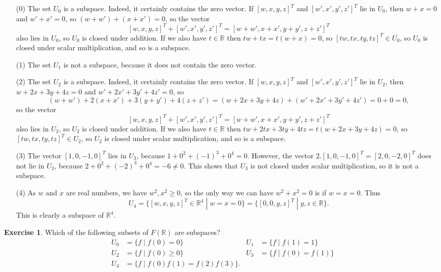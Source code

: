 \documentclass{amsart}
\newcommand{\R}         {{\mathbb{R}}}
\newcommand{\st}        {\;|\;}
\renewcommand{\:}       {\colon}
\theoremstyle{definition}
\newtheorem{exercise}{Exercise}[section]
\renewenvironment{solution}{\SolutionAtEnd}{\endSolutionAtEnd}
\begin{document}
\begin{solution}
 \begin{itemize}
  \item[(0)] The set $U_0$ is a subspace.  Indeed, it
   certainly contains the zero vector.  If $[w,x,y,z]^T$ and
   $[w',x',y',z']^T$ lie in $U_0$, then $w+x=0$ and $w'+x'=0$,
   so $(w+w')+(x+x')=0$, so the vector
   \[ [w,x,y,z]^T+[w',x',y',z']^T=[w+w',x+x',y+y',z+z']^T \]
   also lies in $U_0$, so $U_0$ is closed under addition.
   If we also have $t\in\R$ then $tw+tx=t(w+x)=0$, so
   $[tw,tx,ty,tz]^T\in U_0$, so $U_0$ is closed under scalar
   multiplication, and so is a subspace.
  \item[(1)] The set $U_1$ is not a subspace, because it
   does not contain the zero vector.
  \item[(2)] The set $U_2$ is a subspace.  Indeed, it
   certainly contains the zero vector.  If $[w,x,y,z]^T$ and
   $[w',x',y',z']^T$ lie in $U_2$, then $w+2x+3y+4z=0$ and
   $w'+2x'+3y'+4z'=0$, so 
   \[ (w+w')+2(x+x')+3(y+y')+4(z+z') = 
      (w+2x+3y+4z)+(w'+2x'+3y'+4z') = 0+0 = 0,
   \] 
   so the vector
   \[ [w,x,y,z]^T+[w',x',y',z']^T=[w+w',x+x',y+y',z+z']^T \]
   also lies in $U_2$, so $U_2$ is closed under addition.  If we
   also have $t\in\R$ then $tw+2tx+3ty+4tz=t(w+2x+3y+4z)=0$,
   so $[tw,tx,ty,tz]^T\in U_2$, so $U_2$ is closed under
   scalar multiplication, and so is a subspace.
  \item[(3)] The vector $[1,0,-1,0]^T$ lies in $U_3$, because
   $1+0^2+(-1)^3+0^4=0$.  However, the vector
   $2.[1,0,-1,0]^T=[2,0,-2,0]^T$ does not lie in $U_3$, because
   $2+0^2+(-2)^3+0^4=-6\neq 0$.  This shows that $U_3$ is
   not closed under scalar multiplication, so it is not a
   subspace.
  \item[(4)] As $w$ and $x$ are real numbers, we have
   $w^2,x^2\geq 0$, so the only way we can have $w^2+x^2=0$
   is if $w=x=0$.  Thus 
   \[ U_4 = \{[w,x,y,z]^T\in\R^4\st w=x=0\} = 
            \{[0,0,y,z]^T\st y,z\in\R\}. 
   \]
   This is clearly a subspace of $\R^4$.
 \end{itemize}
\end{solution}
\begin{exercise}
 Which of the following subsets of $F(\R)$ are subspaces?
 \begin{align*}
   U_0 &= \{ f \st f(0) = 0 \} &
   U_1 &= \{ f \st f(1) = 1 \} \\
   U_2 &= \{ f \st f(0) \geq 0 \} &
   U_3 &= \{ f \st f(0) = f(1) \} \\
   U_4 &= \{ f \st f(0) f(1) = f(2) f(3) \}.
 \end{align*}
\end{exercise}
\end{document}
